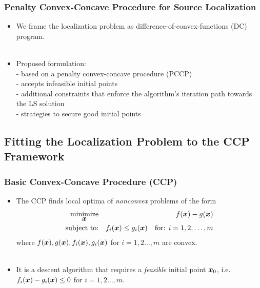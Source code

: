 \documentclass [t] {beamer} %
\begin{document}
\begin{frame} %
\frametitle{Penalty Convex-Concave  Procedure for Source Localization}
\phantom{m}
\begin{itemize}
\item
We frame the localization problem as difference-of-convex-functions
(DC) program.
\\~\\
\item
Proposed formulation:\\
- based on a penalty convex-concave procedure (PCCP)\\
- accepts infeasible initial points\\
- additional constraints that enforce the algorithm's iteration path towards the LS solution\\
- strategies to secure good initial points
\end{itemize}
\end{frame}


\subsection{Fitting the Localization Problem to the CCP Framework}

\begin{frame} %
\frametitle{Basic Convex-Concave Procedure (CCP)} 
\phantom{m}
\begin{itemize}
\item
The CCP finds local optima of \textit{nonconvex} problems of the  form
\begin{eqnarray} \label{eq:5}
 \mathop{\mbox{minimize}}_{\mbox{\boldmath$x$}} & {} & f(\mbox{\boldmath$x$}) - g(\mbox{\boldmath$x$}) \nonumber 
\\ \mbox{subject to:} & {} & f_i(\mbox{\boldmath$x$}) \leq g_i(\mbox{\boldmath$x$}) \quad \mbox{for: }  i = 1, 2, \ldots, m  \nonumber 
\end{eqnarray}
where $f(\mbox{\boldmath$x$}), g(\mbox{\boldmath$x$}) , f_i(\mbox{\boldmath$x$}), g_i(\mbox{\boldmath$x$})$ for $i = 1, 2 \ldots, m$ are convex. 
\\~\\

\item 
It is a descent algorithm that requires a \textit{feasible} initial point $\mbox{\boldmath$x$}_0$, i.e. $f_i(\mbox{\boldmath$x$}) - g_i(\mbox{\boldmath$x$}) \leq 0$ for $i = 1, 2 \ldots, m$.
\end{itemize}
\end{frame}
\end{document}
